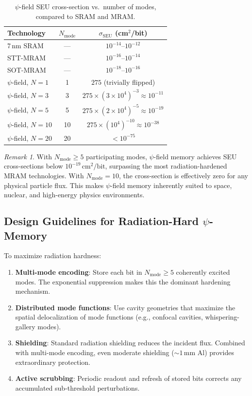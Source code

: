\documentclass[11pt,twocolumn]{article}
\theoremstyle{definition}
\theoremstyle{remark}
\newtheorem{remark}[theorem]{Remark}
\begin{document}
\begin{table}[h]
\centering
\caption{$\psi$-field SEU cross-section vs.\ number of modes, compared
to SRAM and MRAM.}
\label{tab:seu}
\begin{tabular}{@{}lcc@{}}
\toprule
\textbf{Technology} & $N_{\mathrm{mode}}$ & $\sigma_{\mathrm{SEU}}$ (cm$^2$/bit) \\
\midrule
7\,nm SRAM & --- & $10^{-14}$--$10^{-12}$ \\
STT-MRAM & --- & $10^{-16}$--$10^{-14}$ \\
SOT-MRAM & --- & $10^{-18}$--$10^{-16}$ \\
\midrule
$\psi$-field, $N = 1$ & 1 & $275$ (trivially flipped) \\
$\psi$-field, $N = 3$ & 3 & $275 \times (3\times 10^{4})^{-3} \approx 10^{-11}$ \\
$\psi$-field, $N = 5$ & 5 & $275 \times (2\times 10^{4})^{-5} \approx 10^{-19}$ \\
$\psi$-field, $N = 10$ & 10 & $275 \times (10^{4})^{-10} \approx 10^{-38}$ \\
$\psi$-field, $N = 20$ & 20 & $< 10^{-75}$ \\
\bottomrule
\end{tabular}
\end{table}

\begin{remark}
With $N_{\mathrm{mode}} \geq 5$ participating modes, $\psi$-field
memory achieves SEU cross-sections below $10^{-19}\,\mathrm{cm}^2
/\mathrm{bit}$, surpassing the most radiation-hardened MRAM
technologies. With $N_{\mathrm{mode}} = 10$, the cross-section is
effectively zero for any physical particle flux. This makes $\psi$-field
memory inherently suited to space, nuclear, and high-energy physics
environments.
\end{remark}

\subsection{Design Guidelines for Radiation-Hard $\psi$-Memory}
\label{sec:rad_design}

To maximize radiation hardness:
\begin{enumerate}
\item \textbf{Multi-mode encoding}: Store each bit in $N_{\mathrm{mode}}
\geq 5$ coherently excited modes. The exponential suppression makes this
the dominant hardening mechanism.
\item \textbf{Distributed mode functions}: Use cavity geometries that
maximize the spatial delocalization of mode functions (e.g., confocal
cavities, whispering-gallery modes).
\item \textbf{Shielding}: Standard radiation shielding reduces the
incident flux. Combined with multi-mode encoding, even moderate shielding
($\sim 1\,\mathrm{mm}$ Al) provides extraordinary protection.
\item \textbf{Active scrubbing}: Periodic readout and refresh of stored
bits corrects any accumulated sub-threshold perturbations.
\end{enumerate}
\end{document}
